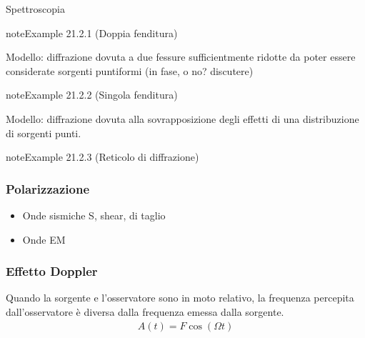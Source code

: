 \documentclass[letterpaper,10pt,italian]{jupyterBook}
\begin{document}
\sphinxAtStartPar
{} Spettroscopia
\label{ch/waves/phenomena:example-3}
\begin{sphinxadmonition}{note}{Example 21.2.1 (Doppia fenditura)}



\sphinxAtStartPar
Modello: diffrazione dovuta a due fessure sufficientmente ridotte da poter essere considerate sorgenti puntiformi (in fase, o no? discutere)
\end{sphinxadmonition}
\label{ch/waves/phenomena:example-4}
\begin{sphinxadmonition}{note}{Example 21.2.2 (Singola fenditura)}



\sphinxAtStartPar
Modello: diffrazione dovuta alla sovrapposizione degli effetti di una distribuzione di sorgenti punti.
\end{sphinxadmonition}
\label{ch/waves/phenomena:example-5}
\begin{sphinxadmonition}{note}{Example 21.2.3 (Reticolo di diffrazione)}


\end{sphinxadmonition}


\subsubsection{Polarizzazione}
\label{\detokenize{ch/waves/phenomena:polarizzazione}}\label{\detokenize{ch/waves/phenomena:physics-hs-waves-effects-polarization}}\begin{itemize}
\item {} 
\sphinxAtStartPar
Onde sismiche S, shear, di taglio

\item {} 
\sphinxAtStartPar
Onde EM

\end{itemize}


\subsubsection{Effetto Doppler}
\label{\detokenize{ch/waves/phenomena:effetto-doppler}}\label{\detokenize{ch/waves/phenomena:physics-hs-waves-effects-doppler}}
\sphinxAtStartPar
Quando la sorgente e l’osservatore sono in moto relativo, la frequenza percepita dall’osservatore è diversa dalla frequenza emessa dalla sorgente.
\begin{equation*}
\begin{split}A(t) = F \cos(\Omega t )\end{split}
\end{equation*}
\end{document}

